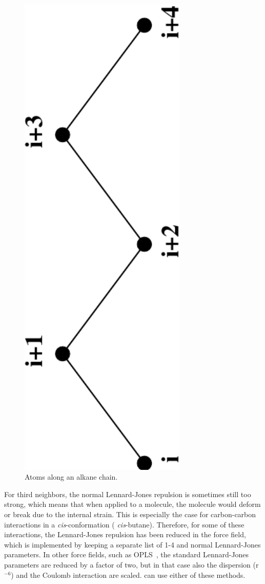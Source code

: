 \begin{figure}
\centerline{\includegraphics[angle=270,width=8cm]{plots/chain}}
\caption{Atoms along an alkane chain.}
\label{fig:chain}
\end{figure}

For third neighbors, the normal Lennard-Jones repulsion is sometimes
still too strong, which means that when applied to a molecule, the
molecule would deform or break due to the internal strain. This is
especially the case for carbon-carbon interactions in a {\em
cis}-conformation ({\eg} {\em cis}-butane).  Therefore, for some of these
interactions, the Lennard-Jones repulsion has been reduced in the
{\gromos} force field, which is implemented by keeping a separate list of
1-4 and normal Lennard-Jones parameters. In other force fields, such
as OPLS~\cite{Jorgensen88}, the standard Lennard-Jones parameters are reduced
by a factor of two, but in that case also the dispersion (r$^{-6}$)
and the Coulomb interaction are scaled.
{\gromacs} can use either of these methods.

